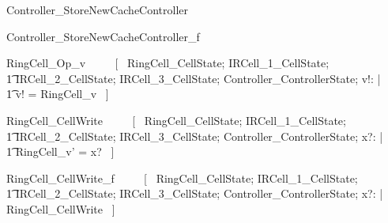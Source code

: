 \documentclass{article}
\begin{document}
\begin{zed}
Controller\_StoreNewCacheController  \\
\end{zed}

\begin{zed}
Controller\_StoreNewCacheController\_f  \\
\end{zed}

\begin{zed}
RingCell\_Op\_v ~~~~ [~ 
    \Xi RingCell\_CellState; 
    \Xi IRCell\_1\_CellState; \\
    \t1 \Xi IRCell\_2\_CellState; 
    \Xi IRCell\_3\_CellState;
    \Xi Controller\_ControllerState; v!: \nat | \\
    \t1 v! = RingCell\_v ~] \\
\end{zed}

\begin{zed}
RingCell\_CellWrite ~~~~ [~ 
    \Delta RingCell\_CellState; 
    \Xi IRCell\_1\_CellState; \\
    \t1 \Xi IRCell\_2\_CellState; 
    \Xi IRCell\_3\_CellState;
    \Xi Controller\_ControllerState; 
    x?: \nat | \\
    \t1 RingCell\_v' = x? ~] \\
\end{zed}

\begin{zed}
RingCell\_CellWrite\_f ~~~~ [~ 
    \Xi RingCell\_CellState; 
    \Xi IRCell\_1\_CellState; \\
    \t1 \Xi IRCell\_2\_CellState; 
    \Xi IRCell\_3\_CellState;
    \Xi Controller\_ControllerState; 
    x?: \nat | \\
    \lnot \pre RingCell\_CellWrite ~] \\
\end{zed}
\end{document}
